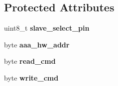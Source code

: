 \subsection*{Protected Attributes}
\begin{DoxyCompactItemize}
\item 
\hypertarget{classMCP23S17_a4dd9535162684571fe934fd26b3f5531}{uint8\-\_\-t {\bfseries slave\-\_\-select\-\_\-pin}}\label{classMCP23S17_a4dd9535162684571fe934fd26b3f5531}

\item 
\hypertarget{classMCP23S17_a6ee55dd507b28ccb620810cf40c1d681}{byte {\bfseries aaa\-\_\-hw\-\_\-addr}}\label{classMCP23S17_a6ee55dd507b28ccb620810cf40c1d681}

\item 
\hypertarget{classMCP23S17_a1a21ef06797ed6899ab8f86087a90389}{byte {\bfseries read\-\_\-cmd}}\label{classMCP23S17_a1a21ef06797ed6899ab8f86087a90389}

\item 
\hypertarget{classMCP23S17_ad9c64890ebb6e80306fdb070578782c0}{byte {\bfseries write\-\_\-cmd}}\label{classMCP23S17_ad9c64890ebb6e80306fdb070578782c0}

\end{DoxyCompactItemize}
